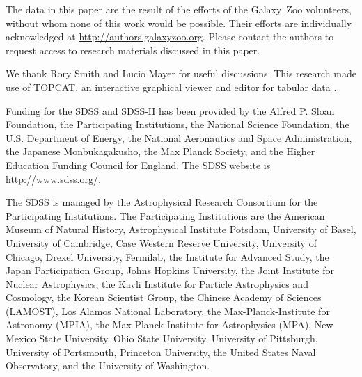 \documentclass{emulateapj}
\begin{document}

\acknowledgments

The data in this paper are the result of the efforts of the Galaxy~Zoo volunteers, without whom none of this work would be possible. Their efforts are individually acknowledged at \url{http://authors.galaxyzoo.org}. Please contact the authors to request access to research materials discussed in this paper. 

We thank Rory Smith and Lucio Mayer for useful discussions. This research made use of TOPCAT, an interactive graphical viewer and editor for tabular data \citep{tay05}. 

Funding for the SDSS and SDSS-II has been provided by the Alfred P. Sloan Foundation, the Participating Institutions, the National Science Foundation, the U.S. Department of Energy, the National Aeronautics and Space Administration, the Japanese Monbukagakusho, the Max Planck Society, and the Higher Education Funding Council for England. The SDSS website is \url{http://www.sdss.org/}.

The SDSS is managed by the Astrophysical Research Consortium for the Participating Institutions. The Participating Institutions are the American Museum of Natural History, Astrophysical Institute Potsdam, University of Basel, University of Cambridge, Case Western Reserve University, University of Chicago, Drexel University, Fermilab, the Institute for Advanced Study, the Japan Participation Group, Johns Hopkins University, the Joint Institute for Nuclear Astrophysics, the Kavli Institute for Particle Astrophysics and Cosmology, the Korean Scientist Group, the Chinese Academy of Sciences (LAMOST), Los Alamos National Laboratory, the Max-Planck-Institute for Astronomy (MPIA), the Max-Planck-Institute for Astrophysics (MPA), New Mexico State University, Ohio State University, University of Pittsburgh, University of Portsmouth, Princeton University, the United States Naval Observatory, and the University of Washington.

\clearpage



\end{document}

